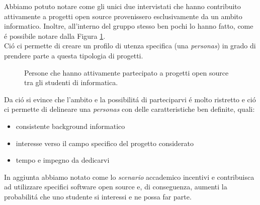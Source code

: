 \documentclass[12pt]{article} %
\begin{document}
Abbiamo potuto notare come gli unici due intervistati che hanno contribuito attivamente a progetti open source provenissero esclusivamente da un ambito informatico. Inoltre, all'interno del gruppo stesso ben pochi lo hanno fatto, come \'e possibile notare dalla Figura \ref{fig:distribuzioneInformatica}.\\
Ci\'o ci permette di creare un profilo di utenza specifica (una \emph{personas}) in grado di prendere parte a questa tipologia di progetti. 

\begin{figure}[H] 
\caption{Persone che hanno attivamente partecipato a progetti open source tra gli studenti di informatica.}
\label{fig:distribuzioneInformatica}
\end{figure}

Da ci\'o si evince che l'ambito e la possibilit\'a di parteciparvi \'e molto ristretto e ci\'o ci permette di delineare una \emph{personas} con delle caratteristiche ben definite, quali:
\begin{itemize}
\item consistente background informatico
\item interesse verso il campo specifico del progetto considerato
\item tempo e impegno da dedicarvi
\end{itemize}

In aggiunta abbiamo notato come lo \emph{scenario} accademico incentivi e contribuisca ad utilizzare specifici software open source e, di conseguenza, aumenti la probabilit\'a che uno studente si interessi e ne possa far parte. 
\newpage
\end{document}
